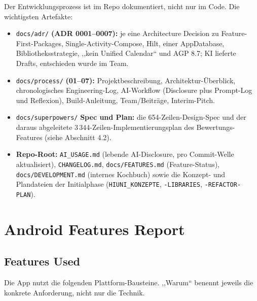 \documentclass{msereport}
\begin{document}
Der Entwicklungsprozess ist im Repo dokumentiert, nicht nur im Code. Die
wichtigsten Artefakte:

\begin{itemize}
  \item \texttt{docs/adr/} \textbf{(ADR 0001--0007):} je eine Architecture
        Decision zu Feature-First-Packages, Single-Activity-Compose, Hilt,
        einer AppDatabase, Bibliotheksstrategie, ,,kein Unified Calendar`` und
        AGP 8.7; KI lieferte Drafts, entschieden wurde im Team.
  \item \texttt{docs/process/} \textbf{(01--07):} Projektbeschreibung,
        Architektur-Überblick, chronologisches Engineering-Log, AI-Workflow
        (Disclosure plus Prompt-Log und Reflexion), Build-Anleitung,
        Team/Beiträge, Interim-Pitch.
  \item \texttt{docs/superpowers/} \textbf{Spec und Plan:} die 654-Zeilen-Design-Spec
        und der daraus abgeleitete 3\,344-Zeilen-Implementierungsplan des
        Bewertungs-Features (siehe Abschnitt 4.2).
  \item \textbf{Repo-Root:} \texttt{AI\_USAGE.md} (lebende AI-Disclosure, pro
        Commit-Welle aktualisiert), \texttt{CHANGELOG.md},
        \texttt{docs/FEATURES.md} (Feature-Status), \texttt{docs/DEVELOPMENT.md}
        (internes Kochbuch) sowie die Konzept- und Plandateien der Initialphase
        (\texttt{HIUNI\_KONZEPTE}, \texttt{-LIBRARIES}, \texttt{-REFACTOR-PLAN}).
\end{itemize}

\msegap

\section{Android Features Report}

\subsection{Features Used}

Die App nutzt die folgenden Plattform-Bausteine. ,,Warum`` benennt jeweils die
konkrete Anforderung, nicht nur die Technik.
\par\vspace{6pt}
\end{document}
